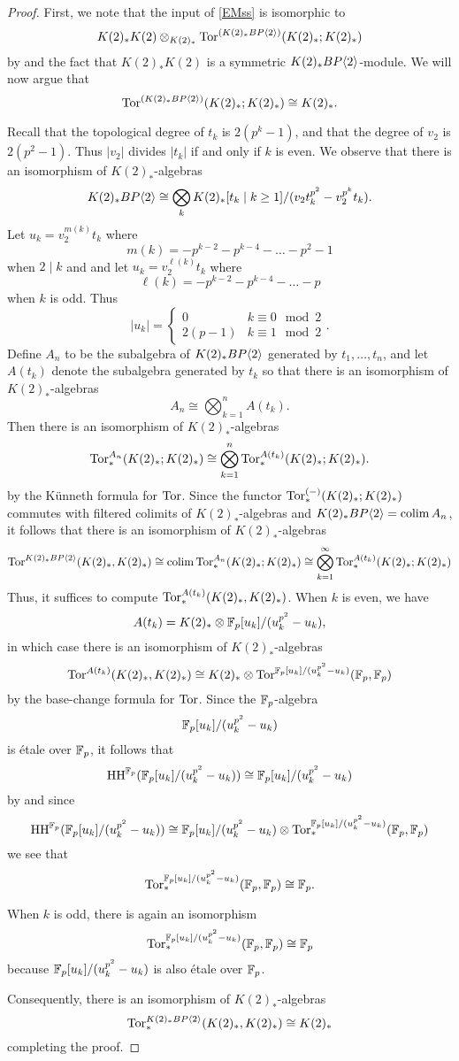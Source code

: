 \begin{proof}
First, we note that 
the input of \eqref{EMss} is isomorphic to 
\[K(2)_*K(2)\otimes_{K(2)_*}\operatorname{Tor}^{(K(2)_*BP\langle 2 \rangle)}(K(2)_*; K(2)_*)\]
by \cite{CE56} and the fact that $K(2)_*K(2)$ is a symmetric $K(2)_*BP\langle 2 \rangle$-module.
We will now argue that 
\[ \operatorname{Tor}^{(K(2)_*BP\langle 2 \rangle)}(K(2)_*; K(2)_*)\cong K(2)_*.\]

Recall that the topological degree of $t_k$ is $2(p^k-1)$, and that the degree of $v_2$ is $2(p^2-1)$. Thus $|v_2|$ divides $|t_k|$ if and only if $k$ is even. We observe that there is an isomorphism of $K(2)_*$-algebras
\[
K(2)_*BP\langle 2 \rangle \cong \bigotimes_k K(2)_*[t_k\mid k\ge 1]/(v_2t_k^{p^2}-v_2^{p^k}t_k).
\] 
Let $u_k=v_2^{m(k)}t_k$ where 
\[
m(k)=-p^{k-2}-p^{k-4} - \dots -p^2-1
\] 
when $2\mid k$ and and let $u_k=v_2^{\ell(k)}t_k$ where 
\[
\ell(k)=-p^{k-2}-p^{k-4} -\dots -p
\] 
when $k$ is odd. Thus
\[
|u_k|= 
\begin{cases}
	0 & k\equiv 0 \mod 2\\
	2(p-1) & k\equiv 1 \mod 2
\end{cases}.
\]
Define $A_n$ to be the subalgebra of $K(2)_*BP\langle 2 \rangle$ generated by $t_1, \ldots , t_n$, and let $A(t_k)$ denote the subalgebra generated by $t_k$ so that there is an isomorphism of $K(2)_*$-algebras
\[ A_n\cong \bigotimes_{k=1}^{n}A(t_k).\] 
Then there is an isomorphism of $K(2)_*$-algebras
\[
\operatorname{Tor}_*^{A_n}(K(2)_*;K(2)_*)\cong \bigotimes_{k=1}^n\operatorname{Tor}_*^{A(t_k)}(K(2)_*;K(2)_*).
\]
by the K\"unneth formula for $\operatorname{Tor}$. Since the functor $\operatorname{Tor}_*^{(-)}(K(2)_*;K(2)_*)$ commutes with filtered colimits of $K(2)_*$-algebras and $K(2)_*BP\langle 2 \rangle=\operatorname*{colim} A_n$, it follows that there is an isomorphism of $K(2)_*$-algebras
\[
\operatorname{Tor}^{K(2)_*BP\langle 2 \rangle}(K(2)_*,K(2)_*) \cong \operatorname*{colim} \operatorname{Tor}_*^{A_n}(K(2)_*;K(2)_*)\cong \bigotimes_{k=1}^\infty\operatorname{Tor}_*^{A(t_k)}(K(2)_*;K(2)_*)
\]
Thus, it suffices to compute $\operatorname{Tor}_*^{A(t_k)}(K(2)_*,K(2)_*)$. When $k$ is even, we have 
\[
A(t_k)= K(2)_*\otimes \mathbb{F}_p[u_k]/(u_k^{p^2}-u_k),
\]
in which case there is an isomorphism of $K(2)_*$-algebras
\[
\operatorname{Tor}^{A(t_k)}(K(2)_*,K(2)_*)\cong K(2)_*\otimes \operatorname{Tor}^{\mathbb{F}_p[u_k]/(u_k^{p^2}-u_k)}(\mathbb{F}_p,\mathbb{F}_p)
\]
by the base-change formula for $\operatorname{Tor}$. 
Since the $\mathbb{F}_p$-algebra
\[
\mathbb{F}_p[u_k]/(u_k^{p^2}-u_k)
\]
is \'etale over $\mathbb{F}_p$, it follows that 
\[
\operatorname{HH}^{\mathbb{F}_p}(\mathbb{F}_p[u_k]/(u_k^{p^2}-u_k))\cong \mathbb{F}_p[u_k]/(u_k^{p^2}-u_k)
\]
by \cite{WeibelGeller} and since 
\[ \operatorname{HH}^{\mathbb{F}_p}(\mathbb{F}_p[u_k]/(u_k^{p^2}-u_k))\cong \mathbb{F}_p[u_k]/(u_k^{p^2}-u_k)\otimes \operatorname{Tor}_*^{\mathbb{F}_p[u_k]/(u_k^{p^2}-u_k)}(\mathbb{F}_p,\mathbb{F}_p)\]
we see that 
\[\operatorname{Tor}_*^{\mathbb{F}_p[u_k]/(u_k^{p^2}-u_k)}(\mathbb{F}_p,\mathbb{F}_p)\cong \mathbb{F}_p.\]

When $k$ is odd,  there is again an isomorphism
\[ \operatorname{Tor}_*^{\mathbb{F}_p[u_k]/(u_k^{p^2}-u_k)}(\mathbb{F}_p, \mathbb{F}_p)\cong \mathbb{F}_p\] because 
$\mathbb{F}_p[u_k]/(u_k^{p^2}-u_k)$ is also \'etale over $\mathbb{F}_p$.

Consequently, there is an isomorphism of $K(2)_*$-algebras
\[ \operatorname{Tor}_*^{K(2)_*BP\langle 2 \rangle}(K(2)_*,K(2)_*)\cong K(2)_* \]
completing the proof.
\end{proof}
